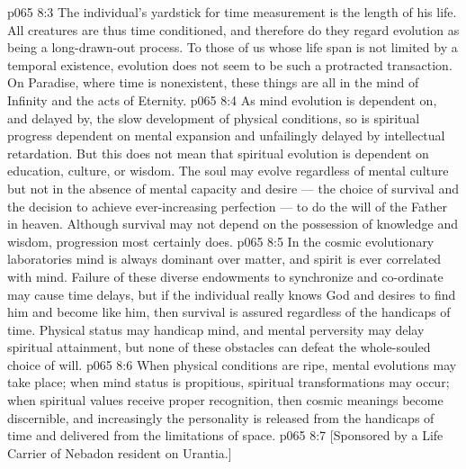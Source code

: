 \vs p065 8:3 The individual’s yardstick for time measurement is the length of his life. All creatures are thus time conditioned, and therefore do they regard evolution as being a long\hyp{}drawn\hyp{}out process. To those of us whose life span is not limited by a temporal existence, evolution does not seem to be such a protracted transaction. On Paradise, where time is nonexistent, these things are all  in the mind of Infinity and the acts of Eternity.
\vs p065 8:4 As mind evolution is dependent on, and delayed by, the slow development of physical conditions, so is spiritual progress dependent on mental expansion and unfailingly delayed by intellectual retardation. But this does not mean that spiritual evolution is dependent on education, culture, or wisdom. The soul may evolve regardless of mental culture but not in the absence of mental capacity and desire --- the choice of survival and the decision to achieve ever\hyp{}increasing perfection --- to do the will of the Father in heaven. Although survival may not depend on the possession of knowledge and wisdom, progression most certainly does.
\vs p065 8:5 \pc In the cosmic evolutionary laboratories mind is always dominant over matter, and spirit is ever correlated with mind. Failure of these diverse endowments to synchronize and co\hyp{}ordinate may cause time delays, but if the individual really knows God and desires to find him and become like him, then survival is assured regardless of the handicaps of time. Physical status may handicap mind, and mental perversity may delay spiritual attainment, but none of these obstacles can defeat the whole\hyp{}souled choice of will.
\vs p065 8:6 When physical conditions are ripe,  mental evolutions may take place; when mind status is propitious,  spiritual transformations may occur; when spiritual values receive proper recognition, then cosmic meanings become discernible, and increasingly the personality is released from the handicaps of time and delivered from the limitations of space.
\vsetoff
\vs p065 8:7 [Sponsored by a Life Carrier of Nebadon resident on Urantia.]
\quizlink

